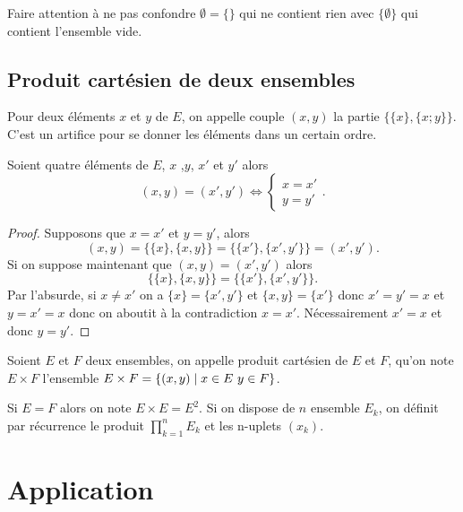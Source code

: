 Faire attention à ne pas confondre \(\emptyset = \{\}\) qui ne contient rien avec \(\{\emptyset\}\) qui contient l'ensemble
vide.

\subsection{Produit cartésien de deux ensembles}
\label{chap3-subsec:prodcart}
\begin{defdef}
  Pour deux éléments \(x\) et \(y\) de \(E\), on appelle couple \((x,y)\) la partie \(\{\{x\},\{x;y\}\}\). C'est un artifice pour se donner les éléments dans un certain ordre.
\end{defdef}
%
\begin{prop}
  Soient quatre éléments de \(E\), \(x\) ,\(y\), \(x'\) et \(y'\) alors 
  \begin{equation} 
    (x,y)=(x',y') \iff \begin{cases} x=x' \\ y=y' \end{cases}.
  \end{equation}
\end{prop}
\begin{proof}
Supposons que \(x=x'\) et \(y=y'\), alors 
\begin{equation}
  (x,y)=\{\{x\},\{x,y\}\}=\{\{x'\},\{x',y'\}\}=(x',y').
\end{equation}
Si on suppose maintenant que \((x,y)=(x',y')\) alors 
\begin{equation}
  \{\{x\},\{x,y\}\}=\{\{x'\},\{x',y'\}\}.
\end{equation}
Par l'absurde, si \(x \neq x'\) on a \(\{x\}=\{x',y'\}\) et \(\{x,y\} = \{x'\}\) donc \(x'=y'=x\) et \(y=x'=x\) donc on aboutit à la contradiction \(x=x'\). Nécessairement \(x'=x\) et donc \(y=y'\).
\end{proof}
%
\begin{defdef}
  Soient \(E\) et \(F\) deux ensembles, on appelle produit cartésien de \(E\) et \(F\), qu'on note \(E \times F\) l'ensemble $E
  \times F = \left\{(x,y)\mathrel{}\middle|\mathrel{}x \in E \ y \in F\right\}$.
\end{defdef}
Si \(E=F\) alors on note \(E \times E=E^2\). Si on dispose de \(n\) ensemble \(E_k\), on définit par récurrence le produit \(\prod_{k=1}^n E_k\) et les n-uplets \((x_k)\).

\section{Application}
\label{chap3-sec:applications}

